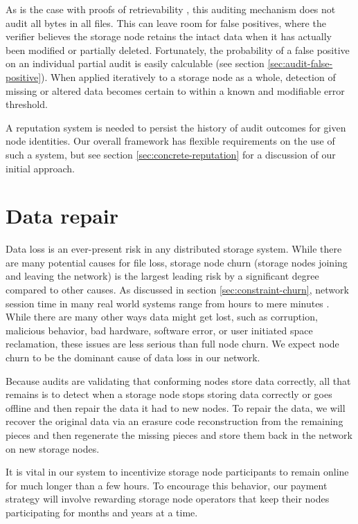 \documentclass[8pt,fleqn,openany]{book}
\begin{document}
As is the case with proofs of retrievability \cite{juels, shacham},
this auditing mechanism does not audit all bytes in all files. This can
leave room for false positives, where the verifier believes the storage node
retains the intact data when it has actually been modified or partially
deleted. Fortunately, the probability of a false positive on an individual
partial audit is easily calculable (see section
\ref{sec:audit-false-positive}). When applied
iteratively to a storage node as a whole, detection of missing or altered data
becomes certain to within a known and modifiable error threshold.

A reputation system is needed to persist the history of audit outcomes for
given node identities. Our overall framework has flexible requirements on the use
of such a system, but see section \ref{sec:concrete-reputation} for a
discussion of our initial approach.

\section{Data repair}

Data loss is an ever-present risk in any distributed storage system. While there
are many potential causes for file loss, storage node churn (storage
nodes joining and leaving the network) is the largest leading risk by a
significant degree compared to other causes.
As discussed in section \ref{sec:constraint-churn}, network session time in
many real world systems range from hours to mere minutes \cite{dht-churn}.
While there are many other ways data might get lost, such as corruption,
malicious behavior, bad hardware, software error, or user initiated space
reclamation, these issues are less serious than full node churn. We expect
node churn to be the dominant cause of data loss in our network.

Because audits are validating that conforming nodes store data correctly, all
that remains is to detect when a storage node stops storing
data correctly or goes offline and then repair the data it had to new nodes.
To repair the data, we will recover the original data via an erasure code
reconstruction from the remaining pieces and then regenerate the missing
pieces and store them back in the network on new storage nodes.

It is vital in our system to incentivize storage node participants to remain
online for much longer than a few hours. To encourage this behavior,
our payment strategy will involve rewarding storage node
operators that keep their nodes participating for months and years at a time.
\end{document}
